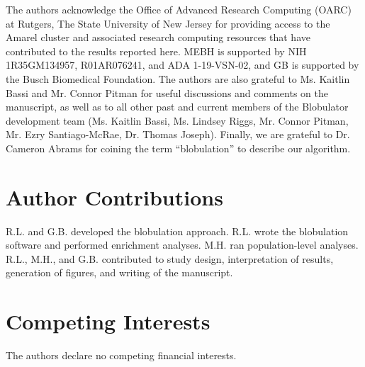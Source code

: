 \documentclass[9pt,twocolumn,twoside,lineno]{pnas-new}
\newcommand{\inserted}[1]{{#1}}
\begin{document}
The authors acknowledge the Office of Advanced Research Computing (OARC) at Rutgers, The State University of New Jersey for providing access to the Amarel cluster and associated research computing resources that have contributed to the results reported here. MEBH is supported by NIH 1R35GM134957, R01AR076241, and ADA 1-19-VSN-02, and GB is supported by the Busch Biomedical Foundation. The authors are also grateful to Ms. Kaitlin Bassi and Mr. Connor Pitman for useful discussions and comments on the manuscript, \inserted{as well as to all other past and current members of the Blobulator development team (Ms. Kaitlin Bassi, Ms. Lindsey Riggs, Mr. Connor Pitman, Mr. Ezry Santiago-McRae, Dr. Thomas Joseph).} Finally, we are grateful to Dr. Cameron Abrams for coining the term ``blobulation'' to describe our algorithm. 

\section*{Author Contributions}
R.L. and G.B. developed the blobulation approach. R.L. wrote the blobulation software and performed enrichment analyses.  M.H. ran population-level analyses.  R.L., M.H., and G.B. contributed to study design, interpretation of results, generation of figures, and writing of the manuscript. 
 
\section*{Competing Interests} 
The authors declare no competing financial interests.

\end{document}
